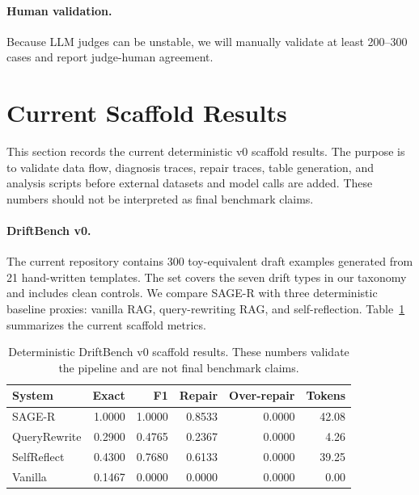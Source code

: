 \documentclass[letterpaper]{article}
\begin{document}
\paragraph{Human validation.}
Because LLM judges can be unstable, we will manually validate at least 200--300 cases and report judge-human agreement.

\section{Current Scaffold Results}

This section records the current deterministic v0 scaffold results. The purpose is to validate data flow, diagnosis traces, repair traces, table generation, and analysis scripts before external datasets and model calls are added. These numbers should not be interpreted as final benchmark claims.

\paragraph{DriftBench v0.}
The current repository contains 300 toy-equivalent draft examples generated from 21 hand-written templates. The set covers the seven drift types in our taxonomy and includes clean controls. We compare \textsc{SAGE-R} with three deterministic baseline proxies: vanilla RAG, query-rewriting RAG, and self-reflection. Table~\ref{tab:v0-main} summarizes the current scaffold metrics.

\begin{table}[t]
\centering
\scriptsize
\setlength{\tabcolsep}{3pt}
\begin{tabular}{lrrrrr}
\toprule
System & Exact & F1 & Repair & Over-repair & Tokens \\
\midrule
SAGE-R & 1.0000 & 1.0000 & 0.8533 & 0.0000 & 42.08 \\
QueryRewrite & 0.2900 & 0.4765 & 0.2367 & 0.0000 & 4.26 \\
SelfReflect & 0.4300 & 0.7680 & 0.6133 & 0.0000 & 39.25 \\
Vanilla & 0.1467 & 0.0000 & 0.0000 & 0.0000 & 0.00 \\
\bottomrule
\end{tabular}
\caption{Deterministic DriftBench v0 scaffold results. These numbers validate the pipeline and are not final benchmark claims.}
\label{tab:v0-main}
\end{table}
\end{document}
